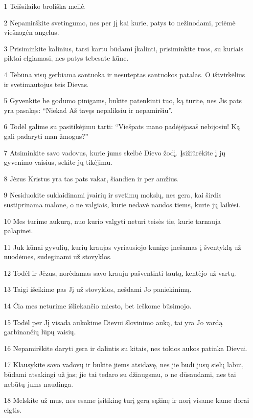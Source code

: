 \par 1 Teišsilaiko broliška meilė. 
\par 2 Nepamirškite svetingumo, nes per jį kai kurie, patys to nežinodami, priėmė viešnagėn angelus. 
\par 3 Prisiminkite kalinius, tarsi kartu būdami įkalinti, prisiminkite tuos, su kuriais piktai elgiamasi, nes patys tebesate kūne. 
\par 4 Tebūna visų gerbiama santuoka ir nesuteptas santuokos patalas. O ištvirkėlius ir svetimautojus teis Dievas. 
\par 5 Gyvenkite be godumo pinigams, būkite patenkinti tuo, ką turite, nes Jis pats yra pasakęs: “Niekad Aš tavęs nepaliksiu ir nepamiršiu”. 
\par 6 Todėl galime su pasitikėjimu tarti: “Viešpats mano padėjėjas­aš nebijosiu! Ką gali padaryti man žmogus?” 
\par 7 Atsiminkite savo vadovus, kurie jums skelbė Dievo žodį. Įsižiūrėkite į jų gyvenimo vaisius, sekite jų tikėjimu. 
\par 8 Jėzus Kristus yra tas pats vakar, šiandien ir per amžius. 
\par 9 Nesiduokite suklaidinami įvairių ir svetimų mokslų, nes gera, kai širdis sustiprinama malone, o ne valgiais, kurie nedavė naudos tiems, kurie jų laikėsi. 
\par 10 Mes turime aukurą, nuo kurio valgyti neturi teisės tie, kurie tarnauja palapinei. 
\par 11 Juk kūnai gyvulių, kurių kraujas vyriausiojo kunigo įnešamas į šventyklą už nuodėmes, sudeginami už stovyklos. 
\par 12 Todėl ir Jėzus, norėdamas savo krauju pašventinti tautą, kentėjo už vartų. 
\par 13 Taigi išeikime pas Jį už stovyklos, nešdami Jo paniekinimą. 
\par 14 Čia mes neturime išliekančio miesto, bet ieškome būsimojo. 
\par 15 Todėl per Jį visada aukokime Dievui šlovinimo auką, tai yra Jo vardą garbinančių lūpų vaisių. 
\par 16 Nepamirškite daryti gera ir dalintis su kitais, nes tokios aukos patinka Dievui. 
\par 17 Klausykite savo vadovų ir būkite jiems atsidavę, nes jie budi jūsų sielų labui, būdami atsakingi už jas; jie tai tedaro su džiaugsmu, o ne dūsaudami, nes tai nebūtų jums naudinga. 
\par 18 Melskite už mus, nes esame įsitikinę turį gerą sąžinę ir norį visame kame dorai elgtis. 
